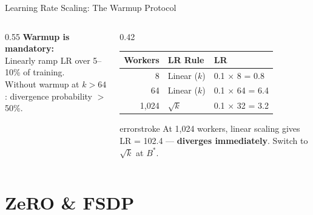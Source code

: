 \documentclass[aspectratio=169, 12pt]{beamer}
\begin{document}
\begin{frame}{Learning Rate Scaling: The Warmup Protocol}
\begin{columns}[T]
\begin{column}{0.55\textwidth}
    \vspace{0.15cm}
    \textbf{Warmup is mandatory:}\\
    {\footnotesize Linearly ramp LR over 5--10\% of training.\\
    Without warmup at $k > 64$: divergence probability $>$50\%.}
  \end{column}
  \begin{column}{0.42\textwidth}
    \vspace{0.1cm}
    \renewcommand{\arraystretch}{1.15}
    {\footnotesize
    \begin{tabular}{@{}rll@{}}
      \toprule
      \textbf{Workers} & \textbf{LR Rule} & \textbf{LR} \\
      \midrule
      8   & Linear ($k$)    & 0.1 $\times$ 8 = 0.8 \\
      64  & Linear ($k$)    & 0.1 $\times$ 64 = 6.4 \\
      1,024 & $\sqrt{k}$ & 0.1 $\times$ 32 = 3.2 \\
      \bottomrule
    \end{tabular}
    }

    \vspace{0.1cm}
    \begin{mlsyscard}{errorstroke}
    {\scriptsize At 1,024 workers, linear scaling gives LR = 102.4 --- \textbf{diverges immediately}. Switch to $\sqrt{k}$ at $B^*$.}
    \end{mlsyscard}
  \end{column}
\end{columns}

\end{frame}

\section{ZeRO \& FSDP}
\end{document}
